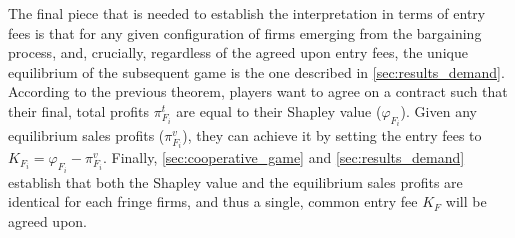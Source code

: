 \documentclass[a4paper]{article}
\begin{document}
The final piece that is needed to establish the interpretation in terms of entry fees is that for any given configuration of firms emerging from the bargaining process, and, crucially, regardless of the agreed upon entry fees, the unique equilibrium of the subsequent game is the one described in \cref{sec:results_demand}.
According to the previous theorem, players want to agree on a contract such that their final, total profits $\pi^t_{F_i}$ are equal to their Shapley value ($\varphi_{F_i}$).
Given any equilibrium sales profits ($\pi^v_{F_i}$), they can achieve it by setting the entry fees to $K_{F_i} = \varphi_{F_i} - \pi^v_{F_i}$.
Finally, \cref{sec:cooperative_game} and \cref{sec:results_demand} establish that both the Shapley value and the equilibrium sales profits are identical for each fringe firms, and thus a single, common entry fee $K_F$ will be agreed upon.






\end{document}
